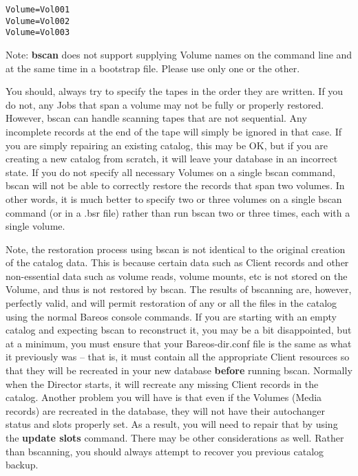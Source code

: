 \footnotesize
\begin{verbatim}
Volume=Vol001
Volume=Vol002
Volume=Vol003
\end{verbatim}
\normalsize

Note: {\bf bscan} does not support supplying Volume names on the
command line and at the same time in a bootstrap file.  Please
use only one or the other.

You should, always try to specify the tapes in the order they are written.
If you do not, any Jobs that span a volume may not be fully or properly
restored. However, bscan can handle scanning tapes that are not sequential.  Any
incomplete records at the end of the tape will simply be ignored in that
case.  If you are simply repairing an existing catalog, this may be OK, but
if you are creating a new catalog from scratch, it will leave your database
in an incorrect state.  If you do not specify all necessary Volumes on a
single bscan command, bscan will not be able to correctly restore the
records that span two volumes.  In other words, it is much better to
specify two or three volumes on a single bscan command (or in a .bsr file)
rather than run bscan two or three times, each with a single volume.

Note, the restoration process using bscan is not identical to the original
creation of the catalog data. This is because certain data such as Client
records and other non-essential data such
as volume reads, volume mounts, etc is not stored on the Volume, and thus is
not restored by bscan. The results of bscanning are, however, perfectly valid,
and will permit restoration of any or all the files in the catalog using the
normal Bareos console commands.  If you are starting with an empty catalog
and expecting bscan to reconstruct it, you may be a bit disappointed, but
at a minimum, you must ensure that your Bareos-dir.conf file is the same
as what it previously was -- that is, it must contain all the appropriate
Client resources so that they will be recreated in your new database {\bf
before} running bscan. Normally when the Director starts, it will recreate
any missing Client records in the catalog.  Another problem you will have
is that even if the Volumes (Media records) are recreated in the database,
they will not have their autochanger status and slots properly set. As a
result, you will need to repair that by using the {\bf update slots}
command.  There may be other considerations as well.  Rather than
bscanning, you should always attempt to recover you previous catalog
backup.


